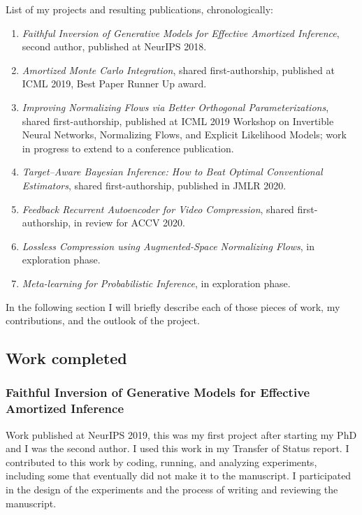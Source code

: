 \documentclass[12pt]{article}
\begin{document}
List of my projects and resulting publications, chronologically:
\begin{enumerate}
\item \emph{Faithful Inversion of Generative Models for Effective Amortized Inference}, second author, published at NeurIPS 2018. \citep{Webb2018faithful}
\item \emph{Amortized Monte Carlo Integration}, shared first-authorship, published at ICML 2019, Best Paper Runner Up award. \citep{Golinski2019amci}
\item \emph{Improving Normalizing Flows via Better Orthogonal Parameterizations}, shared first-authorship, published at ICML 2019 Workshop on Invertible Neural Networks, Normalizing Flows, and Explicit Likelihood Models; work in progress to extend to a conference publication. \citep{Golinski2019orthogonal}
\item \emph{Target–Aware Bayesian Inference: How to Beat Optimal Conventional Estimators}, shared first-authorship, published in JMLR 2020. \citep{Rainforth2020tabi}
\item \emph{Feedback Recurrent Autoencoder for Video Compression}, shared first-authorship, in review for ACCV 2020. \citep{Golinski2020feedback}
\item \emph{Lossless Compression using Augmented-Space Normalizing Flows}, in exploration phase.
\item \emph{Meta-learning for Probabilistic Inference}, in exploration phase.
\end{enumerate}

In the following section I will briefly describe each of those pieces of work, my contributions, and the outlook of the project.


\subsection{Work completed}

\subsubsection{Faithful Inversion of Generative Models for Effective Amortized Inference}%
Work published at NeurIPS 2019, this was my first project after starting my PhD and I was the second author.
I used this work in my Transfer of Status report.
I contributed to this work by coding, running, and analyzing experiments, including some that eventually did not make it to the manuscript. 
I participated in the design of the experiments and the process of writing and reviewing the manuscript.
\end{document}
